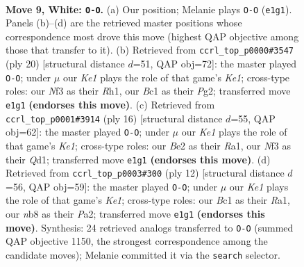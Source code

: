 \documentclass[11pt]{article}
\begin{document}
\clearpage

\begin{figure}[p]\centering
\begin{subfigure}{0.46\textwidth}\centering
\resizebox{\linewidth}{!}{%
\newchessgame
\chessboard[
  setfen={rnb2rk1/ppq1bppp/4pn2/2Pp4/3P4/2N2N2/PP2BPPP/R1BQK2R w KQ - 3 9},
  showmover=false,
  pgfstyle=straightmove, color=movearrow, markmove={e1-g1}
]}
\caption{}
\end{subfigure}\hfill
\begin{subfigure}{0.46\textwidth}\centering
\resizebox{\linewidth}{!}{%
\newchessgame
\chessboard[
  setfen={rnbq1rk1/4bppp/p2p1n2/1ppP4/4P3/P1N2N2/1P2BPPP/R1BQK2R w KQ - 1 11},
  showmover=false,
  pgfstyle=straightmove, color=movearrow, markmove={e1-g1}
]}
\caption{}
\end{subfigure}
\\[4pt]
\begin{subfigure}{0.46\textwidth}\centering
\resizebox{\linewidth}{!}{%
\newchessgame
\chessboard[
  setfen={r1bq1rk1/ppp2pbp/2n2np1/4p3/4P3/2NPBN2/PPP1B1PP/R2QK2R w KQ - 2 9},
  showmover=false,
  pgfstyle=straightmove, color=movearrow, markmove={e1-g1}
]}
\caption{}
\end{subfigure}\hfill
\begin{subfigure}{0.46\textwidth}\centering
\resizebox{\linewidth}{!}{%
\newchessgame
\chessboard[
  setfen={rn1qkb1r/p3pppp/2p1bn2/1p6/2pP4/2N1PN2/PP2BPPP/R1BQK2R w KQkq - 2 7},
  showmover=false,
  pgfstyle=straightmove, color=movearrow, markmove={e1-g1}
]}
\caption{}
\end{subfigure}
\caption{\textbf{Move 9, White: \texttt{O-O}.} (a) Our position; Melanie plays \texttt{O-O} (\texttt{e1g1}). Panels (b)--(d) are the retrieved master positions whose correspondence most drove this move (highest QAP objective among those that transfer to it). (b) Retrieved from \texttt{ccrl\_top\_p0000\#3547} (ply 20) [structural distance $d$=51, QAP obj=72]: the master played \texttt{O-O}; under $\mu$ our \emph{Ke1} plays the role of that game's \emph{Ke1}; cross-type roles: our \emph{N}f3 as their \emph{R}h1, our \emph{B}c1 as their \emph{P}g2; transferred move \texttt{e1g1} \textbf{(endorses this move)}. (c) Retrieved from \texttt{ccrl\_top\_p0001\#3914} (ply 16) [structural distance $d$=55, QAP obj=62]: the master played \texttt{O-O}; under $\mu$ our \emph{Ke1} plays the role of that game's \emph{Ke1}; cross-type roles: our \emph{B}e2 as their \emph{R}a1, our \emph{N}f3 as their \emph{Q}d1; transferred move \texttt{e1g1} \textbf{(endorses this move)}. (d) Retrieved from \texttt{ccrl\_top\_p0003\#300} (ply 12) [structural distance $d$=56, QAP obj=59]: the master played \texttt{O-O}; under $\mu$ our \emph{Ke1} plays the role of that game's \emph{Ke1}; cross-type roles: our \emph{B}c1 as their \emph{R}a1, our \emph{n}b8 as their \emph{P}a2; transferred move \texttt{e1g1} \textbf{(endorses this move)}. Synthesis: 24 retrieved analogs transferred to \texttt{O-O} (summed QAP objective 1150, the strongest correspondence among the candidate moves); Melanie committed it via the \texttt{search} selector.}
\label{fig:thought-m16}
\end{figure}
\end{document}
